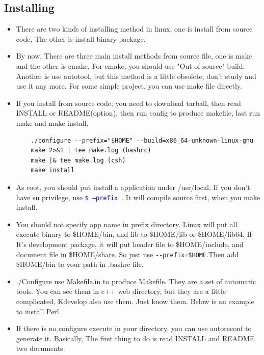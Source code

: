 \documentclass[a4paper,11pt,twoside]{book}
\newcommand{\linuxcommand}[1]{\texttt{\textcolor{blue}{\$ #1 \Pisymbol{psy}{191}}}}
\begin{document}
\subsection{Installing}
\begin{itemize}
		\item There are two kinds of installing method in linux, one is install from source code, The other is install binary package.

		\item By now, There are three main install methods from source file, one is make and the other is cmake, For cmake, you should use "Out of source" build. Another is use autotool, but this method is a little obsolete, don't study and use it any more. For some simple project, you can use make file directly. 

		\item If you install from source code, you need to download tarball, then read INSTALL or README(option), then run config to produce makefile, last run make and make install.
\begin{verbatim}
	./configure --prefix="$HOME" --build=x86_64-unknown-linux-gnu 
	make 2>&1 | tee make.log (bashrc)
	make |& tee make.log (csh)
	make install 
\end{verbatim}

     \item As root, you should put install a application under /usr/local. If you don't have su privilege, use \linuxcommand{--prefix}.  It will compile source first, when you make install.

	 \item You should not specify app name in prefix directory. Linux will put all execute binary to \$HOME/bin, and lib to \$HOME/lib or \$HOME/lib64. If It's development package, it will put header file to \$HOME/include, and document file in \$HOME/share. So just use \verb!--prefix=$HOME!.Then add \$HOME/bin to your path in .bashrc file.  
	
	 \item./Configure use Makefile.in to produce Makefile. They are a set of automatic tools. You can see them in c++ web directory, but they are a little complicated, Kdevelop also use them.  Just know them.  Below is an example to install Perl.

	 \item If there is no configure execute in your directory, you can use autoreconf to generate it. Basically, The first thing to do is read INSTALL and README two documents. 


\end{itemize}
\end{document}
